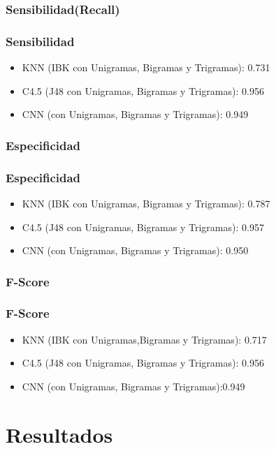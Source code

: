 \documentclass{beamer}
\begin{document}
\subsubsection{Sensibilidad(Recall)}
\begin{frame}
\frametitle{Sensibilidad}
\begin{itemize}
\item KNN (IBK con Unigramas, Bigramas y Trigramas): 0.731
\item C4.5 (J48 con Unigramas, Bigramas y Trigramas): 0.956
\item CNN (con Unigramas, Bigramas y Trigramas): 0.949 
\end{itemize}
\end{frame}
\subsubsection{Especificidad}
\begin{frame}
\frametitle{Especificidad}
\begin{itemize}
\item KNN (IBK con Unigramas, Bigramas y Trigramas): 0.787
\item C4.5 (J48 con Unigramas, Bigramas y Trigramas): 0.957
\item CNN (con Unigramas, Bigramas y Trigramas): 0.950
\end{itemize}
\end{frame}
\subsubsection{F-Score}
\begin{frame}
\frametitle{F-Score}
\begin{itemize}
\item KNN (IBK con Unigramas,Bigramas y Trigramas): 0.717
\item C4.5 (J48 con Unigramas, Bigramas y Trigramas): 0.956
\item CNN (con Unigramas, Bigramas y Trigramas):0.949
\end{itemize}
\end{frame}



\section{Resultados}
\end{document}
